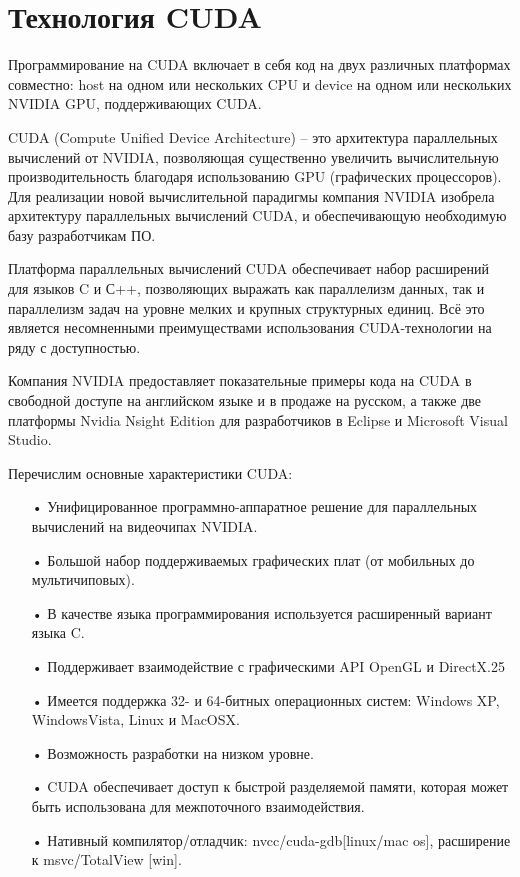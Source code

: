 \documentclass[a4paper,14pt,russian]{extreport}
\begin{document}
\section{Технология CUDA}

Программирование на CUDA включает в себя код на двух различных платформах совместно: host на одном или нескольких CPU и device на одном или нескольких NVIDIA GPU, поддерживающих CUDA.
\cite{cuda_best} \cite{sanders} \cite{kirk} \cite{boreskov}
\par CUDA (Compute Unified Device Architecture) – это архитектура параллельных вычислений от NVIDIA, позволяющая существенно увеличить вычислительную производительность благодаря использованию GPU (графических процессоров). Для реализации новой вычислительной парадигмы компания NVIDIA изобрела архитектуру параллельных вычислений CUDA, и обеспечивающую необходимую базу разработчикам ПО.
\par Платформа параллельных вычислений CUDA обеспечивает набор расширений для языков C и С++, позволяющих выражать как параллелизм данных, так и параллелизм задач на уровне мелких и крупных структурных единиц. Всё это является несомненными преимуществами использования CUDA-технологии на ряду с доступностью.
\par Компания NVIDIA предоставляет показательные примеры кода на CUDA \cite{sanders} в свободной доступе на английском языке и в продаже на русском, а также две платформы Nvidia Nsight Edition для разработчиков в Eclipse и Microsoft Visual Studio. 
\par Перечислим основные характеристики CUDA:
  \begin{itemize}
  \item[•] Унифицированное программно-аппаратное решение для параллельных вычислений на видеочипах NVIDIA.
  \item[•] Большой набор поддерживаемых графических плат (от мобильных до мультичиповых).
  \item[•] В качестве языка программирования используется расширенный вариант языка C.
  \item[•] Поддерживает взаимодействие с графическими API OpenGL и DirectX.25
  \item[•] Имеется поддержка 32- и 64-битных операционных систем: Windows XP, WindowsVista, Linux и MacOSX.
  \item[•] Возможность разработки на низком уровне.
  \item[•] CUDA обеспечивает доступ к быстрой разделяемой памяти, которая может быть использована для межпоточного взаимодействия.
  \item[•] Нативный компилятор/отладчик: nvcc/cuda-gdb[linux/mac os], расширение к msvc/TotalView [win]. 
  \end{itemize}
\end{document}
